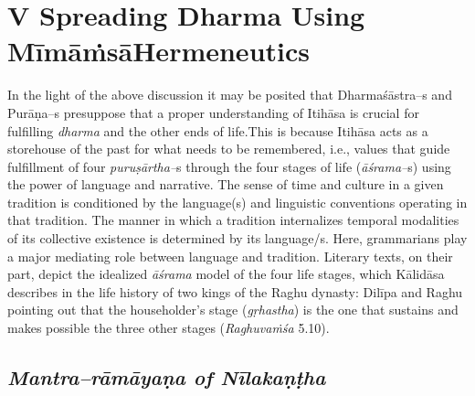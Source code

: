 \section*{V Spreading Dharma Using Mīmāṁsā\hfill \break Hermeneutics}

In the light of the above discussion it may be posited that Dharmaśāstra–s and Purāṇa–s presuppose that a proper understanding of Itihāsa is crucial for fulfilling \textit{dharma} and the other ends of life.This is because Itihāsa acts as a storehouse of the past for what needs to be remembered, i.e., values that guide fulfillment of four \textit{puruṣārtha–}s through the four stages of life (\textit{āśrama–}s) using the power of language and narrative. The sense of time and culture in a given tradition is conditioned by the language(s) and linguistic conventions operating in that tradition. The manner in which a tradition internalizes temporal modalities of its collective existence is determined by its language/s. Here, grammarians play a major mediating role between language and tradition. Literary texts, on their part, depict the idealized \textit{āśrama} model of the four life stages, which Kālidāsa describes in the life history of two kings of the Raghu dynasty: Dilīpa and Raghu pointing out that the householder’s stage (\textit{gṛhastha}) is the one that sustains and makes possible the three other stages (\textit{Raghuvaṁśa} 5.10).

\subsection*{\textit{Mantra–rāmāyaṇa of Nīlakaṇṭha}}

